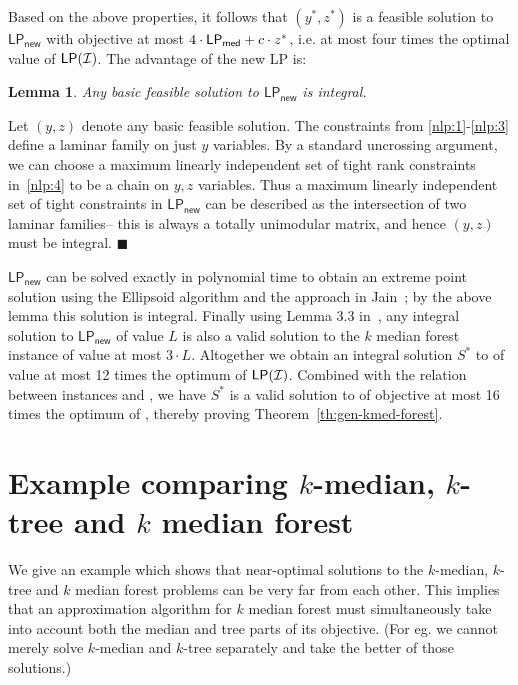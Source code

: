 \documentclass[11pt,twoside,a4paper]{article}
\newtheorem{lemma}[theorem]{Lemma}
\newenvironment{proof}{

\noindent{\bf Proof:}} {\hfill$\blacksquare$


}
\def\kmf{$k$ median forest\xspace}
\begin{document}
Based on the above properties, it follows that $(y^*,z^*)$ is a feasible solution to $\mathsf{LP_{new}}$ with objective
at most $4\cdot \mathsf{LP_{med}} + c\cdot z^*$, i.e. at most four times the optimal value of $\mathsf{LP}({\mathcal{I}})$. The advantage of the new LP
is:
\begin{lemma}
Any basic feasible solution to $\mathsf{LP_{new}}$ is integral.
\end{lemma}
\begin{proof}
Let $(y,z)$ denote any basic feasible solution. The constraints from  \eqref{nlp:1}-\eqref{nlp:3} define a laminar
family on just $y$ variables. By a standard uncrossing argument, we can choose a maximum linearly independent set of
tight rank constraints in~\eqref{nlp:4} to be a chain on $y,z$ variables. Thus a maximum linearly independent set of
tight constraints in $\mathsf{LP_{new}}$ can be described as the intersection of two laminar families-- this is always
a totally unimodular matrix, and hence $(y,z)$ must be integral.
\end{proof}

$\mathsf{LP_{new}}$ can be solved exactly in polynomial time to obtain an extreme point solution using the Ellipsoid
algorithm and the approach in Jain~\cite{J01}; by the above lemma this solution is integral. Finally using Lemma 3.3
in~\cite{KKNSS11}, any integral solution to $\mathsf{LP_{new}}$ of value $L$ is also a valid solution to the \kmf
instance \J of value at most $3\cdot L$. Altogether we obtain an integral solution $S^*$ to \J of value at most 12
times the optimum of $\mathsf{LP}({\mathcal{I}})$. Combined with the relation between instances \I and \J, we have $S^*$ is a valid
solution to \I of objective at most 16 times the optimum of \I, thereby proving Theorem~\ref{th:gen-kmed-forest}.







\appendix

\section{Example comparing $k$-median, $k$-tree and \kmf}\label{app:example}
We give an example which shows that near-optimal solutions to the $k$-median, $k$-tree and \kmf problems can be very
far from each other. This implies that an approximation algorithm for \kmf must simultaneously take into account both
the median and tree parts of its objective. (For eg. we cannot merely solve $k$-median and $k$-tree separately and take
the better of those solutions.)
\end{document}
